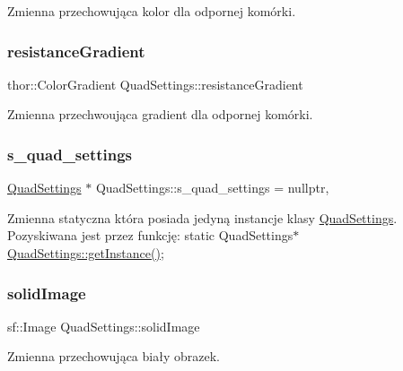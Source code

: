 Zmienna przechowująca kolor dla odpornej komórki. \mbox{\label{class_quad_settings_ac6dde1c3756bc222b42b68d8cb1beba0}} 
\subsubsection{\texorpdfstring{resistance\+Gradient}{resistanceGradient}}
{\footnotesize\ttfamily thor\+::\+Color\+Gradient Quad\+Settings\+::resistance\+Gradient}

Zmienna przechwoująca gradient dla odpornej komórki. \mbox{\label{class_quad_settings_a5d46fe34f768222c9af872e0f52995a6}} 
\subsubsection{\texorpdfstring{s\+\_\+quad\+\_\+settings}{s\_quad\_settings}}
{\footnotesize\ttfamily \mbox{\hyperlink{class_quad_settings}{Quad\+Settings}} $\ast$ Quad\+Settings\+::s\+\_\+quad\+\_\+settings = nullptr\hspace{0.3cm}{\ttfamily [static]}, {\ttfamily [private]}}

Zmienna statyczna która posiada jedyną instancje klasy \mbox{\hyperlink{class_quad_settings}{Quad\+Settings}}. Pozyskiwana jest przez funkcję\+: static Quad\+Settings$\ast$ \mbox{\hyperlink{class_quad_settings_a20d7cfd0c56c11adcdf75c5e3011de67}{Quad\+Settings\+::get\+Instance()}}; \mbox{\label{class_quad_settings_ae9f7a44f5a5f20cb0f388bfac92bf776}} 
\subsubsection{\texorpdfstring{solid\+Image}{solidImage}}
{\footnotesize\ttfamily sf\+::\+Image Quad\+Settings\+::solid\+Image}

Zmienna przechowująca biały obrazek. \mbox{\label{class_quad_settings_a8d11211eb4f03a6eb386e246818de660}} 
